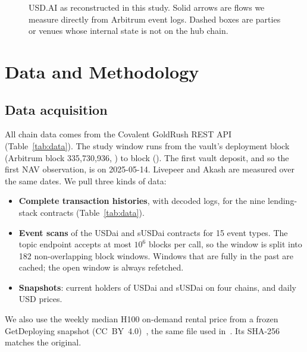 \begin{figure}[t]
\centering
\resizebox{\columnwidth}{!}{}
\caption{USD.AI as reconstructed in this study. Solid arrows are flows we measure directly from Arbitrum event logs. Dashed boxes are parties or venues whose internal state is not on the hub chain.}
\label{fig:arch}
\end{figure}

\section{Data and Methodology}\label{sec:method}

\subsection{Data acquisition}
All chain data comes from the Covalent GoldRush REST API~\cite{goldrush} (Table~\ref{tab:data}). The study window runs from the vault's deployment block (Arbitrum block 335{,}730{,}936, \StudyStart{}) to block \EndBlock{} (\StudyEnd{}). The first vault deposit, and so the first NAV observation, is on 2025-05-14. Livepeer and Akash are measured over the same dates. We pull three kinds of data:
\begin{itemize}
\item \textbf{Complete transaction histories}, with decoded logs, for the nine lending-stack contracts (Table~\ref{tab:data}).
\item \textbf{Event scans} of the USDai and sUSDai contracts for 15 event types. The topic endpoint accepts at most $10^6$ blocks per call, so the window is split into 182 non-overlapping block windows. Windows that are fully in the past are cached; the open window is always refetched.
\item \textbf{Snapshots}: current holders of USDai and sUSDai on four chains, and daily USD prices.
\end{itemize}
We also use the weekly median H100 on-demand rental price from a frozen GetDeploying snapshot (CC~BY~4.0)~\cite{getdeploying}, the same file used in~\cite{cerron2026gpu}. Its SHA-256 matches the original.

